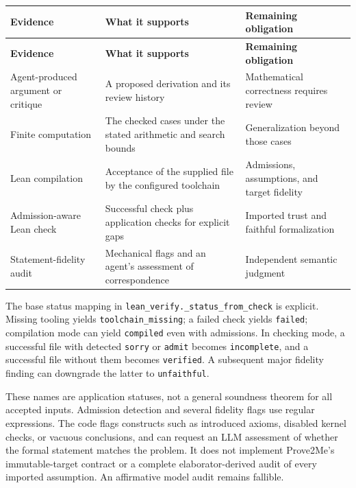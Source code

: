 \documentclass[10pt,letterpaper]{article}
\begin{document}
\begingroup\small
\setlength{\tabcolsep}{4pt}
\begin{longtable}{>{\raggedright\arraybackslash}p{0.23\dimexpr\linewidth-6\tabcolsep\relax}>{\raggedright\arraybackslash}p{0.38\dimexpr\linewidth-6\tabcolsep\relax}>{\raggedright\arraybackslash}p{0.39\dimexpr\linewidth-6\tabcolsep\relax}}
\toprule
\textbf{Evidence} & \textbf{What it supports} & \textbf{Remaining obligation} \\
\midrule\endfirsthead
\toprule
\textbf{Evidence} & \textbf{What it supports} & \textbf{Remaining obligation} \\
\midrule\endhead
\bottomrule\endfoot
Agent-produced argument or critique & A proposed derivation and its review history & Mathematical correctness requires review \\
Finite computation & The checked cases under the stated arithmetic and search bounds & Generalization beyond those cases \\
Lean compilation & Acceptance of the supplied file by the configured toolchain & Admissions, assumptions, and target fidelity \\
Admission-aware Lean check & Successful check plus application checks for explicit gaps & Imported trust and faithful formalization \\
Statement-fidelity audit & Mechanical flags and an agent's assessment of correspondence & Independent semantic judgment \\
\end{longtable}
\endgroup

The base status mapping in \nolinkurl{lean_verify._status_from_check} is explicit. Missing tooling yields \nolinkurl{toolchain_missing}; a failed check yields \nolinkurl{failed}; compilation mode can yield \nolinkurl{compiled} even with admissions. In checking mode, a successful file with detected \nolinkurl{sorry} or \nolinkurl{admit} becomes \nolinkurl{incomplete}, and a successful file without them becomes \nolinkurl{verified}. A subsequent major fidelity finding can downgrade the latter to \nolinkurl{unfaithful}.

These names are application statuses, not a general soundness theorem for all accepted inputs. Admission detection and several fidelity flags use regular expressions. The code flags constructs such as introduced axioms, disabled kernel checks, or vacuous conclusions, and can request an LLM assessment of whether the formal statement matches the problem. It does not implement Prove2Me's immutable-target contract or a complete elaborator-derived audit of every imported assumption. An affirmative model audit remains fallible.
\end{document}
